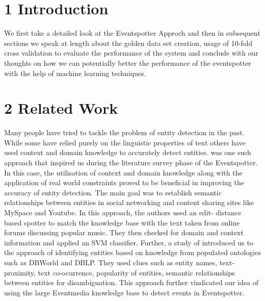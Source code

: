 \documentclass[a4paper,11pt]{report}
\begin{document}
\chapter*{1 Introduction}
We first take a detailed look at the Eventspotter Approch and then in subsequent sections we speak at length about the golden data set creation, usage of 10-fold cross validation to evaluate the performance of the system and conclude with our thoughts on how we can potentially better the performance of the eventspotter with the help of machine learning techniques. 


\chapter*{2 Related Work}
Many people have tried to tackle the problem of entity detection in the past. While some have relied purely on the linguistic properties of text others have used context and domain knowledge to accurately detect entities. \cite{Gruhl_contextand} was one such approach that inspired us during the literature survey phase of the Eventspotter. In this case, the utilisation of context and domain knowledge along with the application of real world constraints proved to be beneficial in improving the accuracy of entity detection. The main goal was to establish semantic relationships between entities in social networking and content sharing sites like MySpace and Youtube. In this approach, the authors used an edit- distance based spotter to match the knowledge base with the text taken from online forums discussing popular music. They then checked for domain and context information and applied an SVM classifier. Further, a study of \cite{Hassell06ontology-drivenautomatic} introduced us to the approach of identifying entities based on knowledge from populated ontologies such as DBWorld and DBLP. They used clues such as entity names, text-proximity, text co-ocurrence, popularity of entities, semantic relationships between entities for disambiguation. This approach further vindicated our idea of using the large Eventmedia knowledge base to detect events in Eventspotter.\newline
\end{document}
